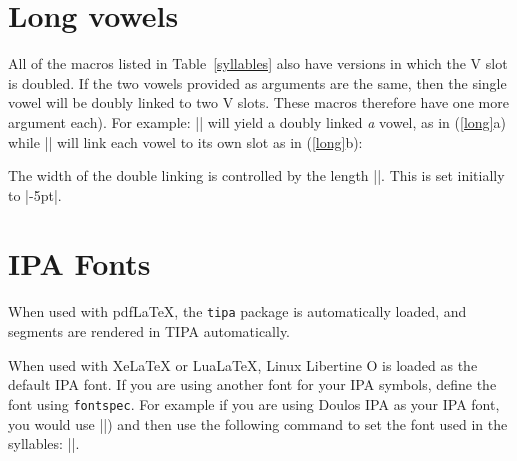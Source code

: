 \documentclass[11pt]{article}
\newcommand*{\pkg}[1]{\texttt{#1}\xspace}
\begin{document}
\section{Long vowels}
All of the macros listed in Table~{\ref{syllables}} also have versions in which the V slot is doubled. If the two vowels provided as arguments are the same, then the single vowel will be doubly linked to two V slots. These macros therefore have one more argument each). For example: || will yield a doubly linked \emph{a} vowel, as in (\ref{long}a)  while || will link each vowel to its own slot as in (\ref{long}b):

\begin{multicols}{2}
\begin{exe}
\ex\label{long}
\begin{xlist}
\ex {}
\ex {}
\end{xlist}
\end{exe}
\end{multicols}

The width of the double linking is controlled by the length |\longVlen|. This is set  initially to |-5pt|.

\section{IPA Fonts}
When used with pdfLaTeX, the \pkg{tipa} package is automatically loaded, and segments are rendered in TIPA automatically.

When used with XeLaTeX or LuaLaTeX, Linux Libertine O is loaded as the default IPA font. If you are using another font for your IPA symbols, define the font using \pkg{fontspec}.  For example if you are using Doulos IPA as your IPA font, you would use  |\newfontfamily{}|) and then use the following command to set the font used in the syllables: |\setIPAfont{\myipafont}|.
\end{document}
